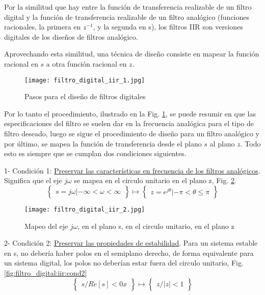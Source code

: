 \documentclass[informe.tex]{subfiles}
\begin{document}
Por la similitud que hay entre la función de transferencia realizable de un filtro digital y la función de transferencia realizable de un filtro analógico (funciones racionales, la primera en $z^{-1}$, y la segunda en s), los filtros IIR son versiones digitales de los diseños de filtros analógico.\newline

Aprovechando esta similitud, una técnica de diseño consiste en mapear la función racional en $s$ a otra función racional en  $z$.

\begin{figure}[h]
		\centering
		\texttt{[image: filtro\_digital\_iir\_1.jpg]}
		\caption{Pasos para el diseño de filtros digitales}
		\label{fig:filtro_digital:iir:proceso}
		\end{figure}	

Por lo tanto el procedimiento, ilustrado en la Fig. \ref{fig:filtro_digital:iir:proceso}, se puede resumir en que las especificaciones del filtro se suelen dar en la frecuencia analógica para el tipo de filtro deseado, luego se sigue el procedimiento de diseño para un filtro analógico y por último, se mapea la función de transferencia desde el plano $s$ al plano $z$. Todo esto es siempre que se cumplan dos condiciones siguientes.\newline

1- Condición 1: \underline{Preservar las características en frecuencia de los filtros analógicos}. Significa que el eje $j\omega$ se mapea en el circulo unitario en el plano z, Fig. \ref{fig:filtro_digital:iir:cond1}.\newline
$$\begin{Bmatrix} s=j\omega | -\infty<\omega<\infty \end{Bmatrix} 
                   \mapsto 
  \begin{Bmatrix} z=e^{j\theta} |  -\pi < \theta  \leq \pi \end{Bmatrix}$$

\begin{figure}[h]
		\centering
		\texttt{[image: filtro\_digital\_iir\_2.jpg]}
		\caption{Mapeo del eje  $j\omega$, en el plano s, en el circulo unitario, en el plano z}
		\label{fig:filtro_digital:iir:cond1}
		\end{figure}		
		
2- Condición 2: \underline{Preservar las propiedades de estabilidad}. Para un sistema estable en s, no debería haber polos en el semiplano derecho, de forma equivalente para un sistema digital, los polos no deberían estar fuera del circulo unitario, Fig. \ref{fig:filtro_digital:iir:cond2}
    $$\begin{Bmatrix} s / Re[s]<0 x \end{Bmatrix} 
              \mapsto 
      \begin{Bmatrix} z /  |z|<1 \end{Bmatrix}
    $$
\end{document}
